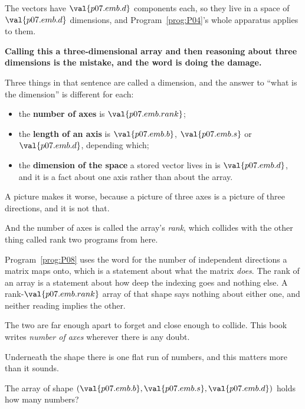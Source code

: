 \begin{fr}
The vectors have $\val{p07.emb.d}$ components each, so they live in a space of
$\val{p07.emb.d}$ dimensions, and Program~\ref{prog:P04}'s whole apparatus
applies to them.

\begin{trapbox}
\textbf{Calling this a three-dimensional array and then reasoning about three
dimensions is the mistake, and the word is doing the damage.}

Three things in that sentence are called a dimension, and the answer to
\enquote{what is the dimension} is different for each:

\begin{itemize}
\item the \textbf{number of axes} is $\val{p07.emb.rank}$;
\item the \textbf{length of an axis} is $\val{p07.emb.b}$,
  $\val{p07.emb.s}$ or $\val{p07.emb.d}$, depending which;
\item the \textbf{dimension of the space} a stored vector lives in is
  $\val{p07.emb.d}$, and it is a fact about one axis rather than about the
  array.
\end{itemize}

A picture makes it worse, because a picture of three axes is a picture of
three directions, and it is not that.
\end{trapbox}
\end{fr}

\begin{fr}
\begin{note}
And the number of axes is called the array's \emph{rank}, which collides with
the other thing called rank two programs from here.

Program~\ref{prog:P08} uses the word for the number of independent directions
a matrix maps onto, which is a statement about what the matrix \emph{does}. The
rank of an array is a statement about how deep the indexing goes and nothing
else. A rank-$\val{p07.emb.rank}$ array of that shape says nothing about either
one, and neither reading implies the other.

The two are far enough apart to forget and close enough to collide. This book
writes \emph{number of axes} wherever there is any doubt.
\end{note}
\end{fr}

\begin{fr}
Underneath the shape there is one flat run of numbers, and this matters more
than it sounds.

The array of shape $(\val{p07.emb.b}, \val{p07.emb.s}, \val{p07.emb.d})$ holds
how many numbers?
\dotline
\nextframe
\end{fr}

